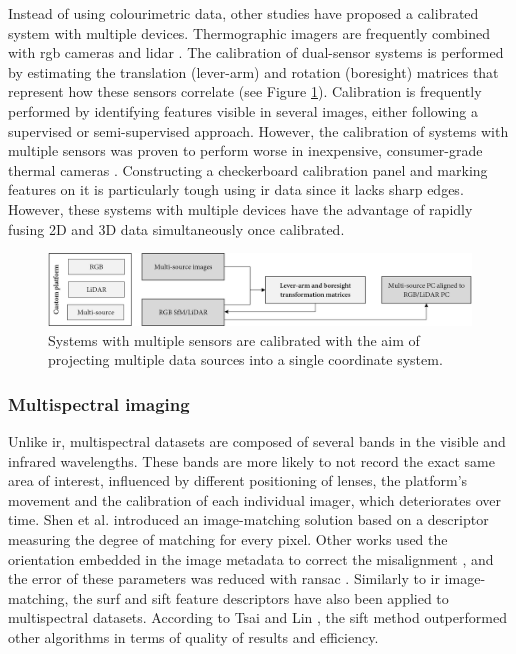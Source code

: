 Instead of using colourimetric data, other studies have proposed a calibrated system with multiple devices. Thermographic imagers are frequently combined with \acrshort{rgb} cameras \cite{javadnejad_photogrammetric_2020, landmann_multimodal_2019, adan_fusion_2017} and \acrshort{lidar} \cite{adan_fusion_2017, hoegner_fusion_2018}. The calibration of dual-sensor systems is performed by estimating the translation (lever-arm) and rotation (boresight) matrices that represent how these sensors correlate (see Figure \ref{fig:fusion_data_04}). Calibration is frequently performed by identifying features visible in several images, either following a supervised or semi-supervised approach. However, the calibration of systems with multiple sensors was proven to perform worse in inexpensive, consumer-grade thermal cameras \cite{javadnejad_photogrammetric_2020}. Constructing a checkerboard calibration panel and marking features on it is particularly tough using \acrshort{ir} data \cite{javadnejad_photogrammetric_2020} since it lacks sharp edges. However, these systems with multiple devices have the advantage of rapidly fusing 2D and 3D data simultaneously once calibrated.

\begin{figure}[ht]
	\includegraphics[width=\linewidth]{figs/context/fusion_04.png}
	\caption{Systems with multiple sensors are calibrated with the aim of projecting multiple data sources into a single coordinate system.}
    \label{fig:fusion_data_04}
\end{figure}

\subsubsection{Multispectral imaging}

Unlike \acrshort{ir}, multispectral datasets are composed of several bands in the visible and infrared wavelengths. These bands are more likely to not record the exact same area of interest, influenced by different positioning of lenses, the platform's movement and the calibration of each individual imager, which deteriorates over time. Shen et al. \cite{shen_multi-modal_2014} introduced an image-matching solution based on a descriptor measuring the degree of matching for every pixel. Other works used the orientation embedded in the image metadata to correct the misalignment \cite{jhan_band--band_2016}, and the error of these parameters was reduced with \acrshort{ransac} \cite{jhan_investigation_2017}. Similarly to \acrshort{ir} image-matching, the \acrshort{surf} \cite{sedaghat_high-resolution_2019} and \acrshort{sift} \cite{saleem_robust_2014} feature descriptors have also been applied to multispectral datasets. According to Tsai and Lin \cite{tsai_accelerated_2017}, the \acrshort{sift} method outperformed other algorithms in terms of quality of results and efficiency.


